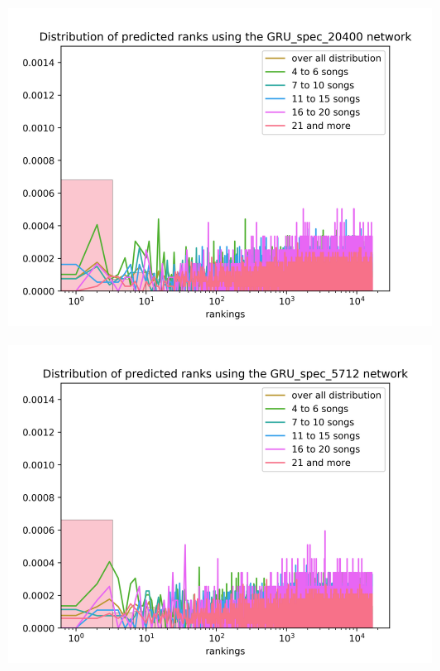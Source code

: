 \begin{figure}[h!]
\centering
\begin{minipage}{.5\textwidth}
  \centering
  \includegraphics[width=1\linewidth]{./img/gru_spec_20400_graph.png}
  \label{fig:gru_spec_20400_distribution}
\end{minipage}%
\begin{minipage}{.5\textwidth}
  \centering
  \includegraphics[width=1\linewidth]{./img/gru_spec_5712_graph.png}
  \label{fig:gru_spec_5712_distribution}
\end{minipage}
\end{figure}\label{fig:gru_spec_distributions}

